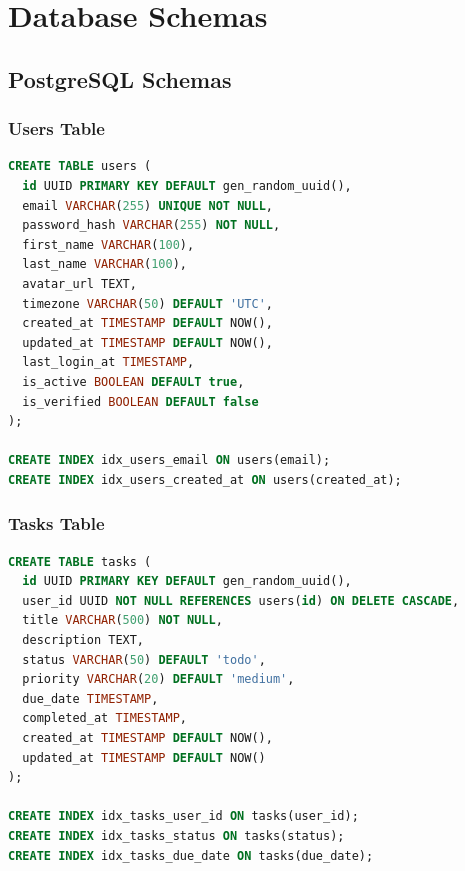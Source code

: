 \chapter{Database Schemas}
\label{appendix:database-schemas}

\section{PostgreSQL Schemas}

\subsection{Users Table}

\begin{lstlisting}[language=SQL, caption=Users Table Schema]
CREATE TABLE users (
  id UUID PRIMARY KEY DEFAULT gen_random_uuid(),
  email VARCHAR(255) UNIQUE NOT NULL,
  password_hash VARCHAR(255) NOT NULL,
  first_name VARCHAR(100),
  last_name VARCHAR(100),
  avatar_url TEXT,
  timezone VARCHAR(50) DEFAULT 'UTC',
  created_at TIMESTAMP DEFAULT NOW(),
  updated_at TIMESTAMP DEFAULT NOW(),
  last_login_at TIMESTAMP,
  is_active BOOLEAN DEFAULT true,
  is_verified BOOLEAN DEFAULT false
);

CREATE INDEX idx_users_email ON users(email);
CREATE INDEX idx_users_created_at ON users(created_at);
\end{lstlisting}

\subsection{Tasks Table}

\begin{lstlisting}[language=SQL, caption=Tasks Table Schema]
CREATE TABLE tasks (
  id UUID PRIMARY KEY DEFAULT gen_random_uuid(),
  user_id UUID NOT NULL REFERENCES users(id) ON DELETE CASCADE,
  title VARCHAR(500) NOT NULL,
  description TEXT,
  status VARCHAR(50) DEFAULT 'todo',
  priority VARCHAR(20) DEFAULT 'medium',
  due_date TIMESTAMP,
  completed_at TIMESTAMP,
  created_at TIMESTAMP DEFAULT NOW(),
  updated_at TIMESTAMP DEFAULT NOW()
);

CREATE INDEX idx_tasks_user_id ON tasks(user_id);
CREATE INDEX idx_tasks_status ON tasks(status);
CREATE INDEX idx_tasks_due_date ON tasks(due_date);
\end{lstlisting}

